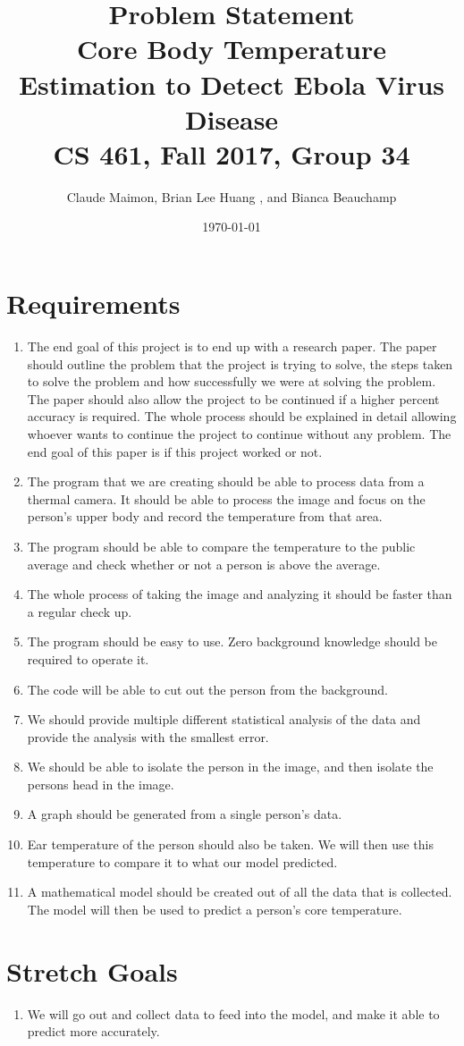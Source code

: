 \documentclass{article}
\title{%
  Problem Statement \\
  \vspace{0.4cm}
  \large Core Body Temperature Estimation to Detect Ebola Virus Disease \\
  \vspace{0.4cm}
  \large CS 461, Fall 2017, Group 34\\
    }
\author{Claude Maimon,  Brian Lee Huang , and Bianca Beauchamp}
\date{\today}
\begin{document}
\maketitle


\begin{abstract}

\end{abstract}

\newpage
\section{Requirements}
	\begin{enumerate}
		\item The end goal of this project is to end up with a research paper. The paper should outline the problem that the project is trying to solve, the steps taken to solve the problem and how successfully we were
		at solving the problem. The paper should also allow the project to be continued if a higher percent accuracy is required. The whole process should be explained in detail allowing whoever wants to continue the
		project to continue without any problem. The end goal of this paper is if this project worked or not.
		\item The program that we are creating should be able to process data from a thermal camera. It should be able to process the image and focus on the person's upper body and record the temperature from that area.
		\item The program should be able to compare the temperature to the public average and check whether or not a person is above the average.
		\item The whole process of taking the image and analyzing it should be faster than a regular check up.
		\item The program should be easy to use. Zero background knowledge should be required to operate it.
		\item The code will be able to cut out the person from the background.
		\item We should provide multiple different statistical analysis of the data and provide the analysis with the smallest error.
		\item We should be able to isolate the person in the image, and then isolate the persons head in the image.
		\item A graph should be generated from a single person's data.
		\item Ear temperature of the person should also be taken. We will then use this temperature to compare it to what our model predicted.
		\item A mathematical model should be created out of all the data that is collected. The model will then be used to predict a person's core temperature.
	\end{enumerate}
\section{Stretch Goals}
	\begin{enumerate}
		\item We will go out and collect data to feed into the model, and make it able to predict more accurately.
	\end{enumerate}
\end{document}
